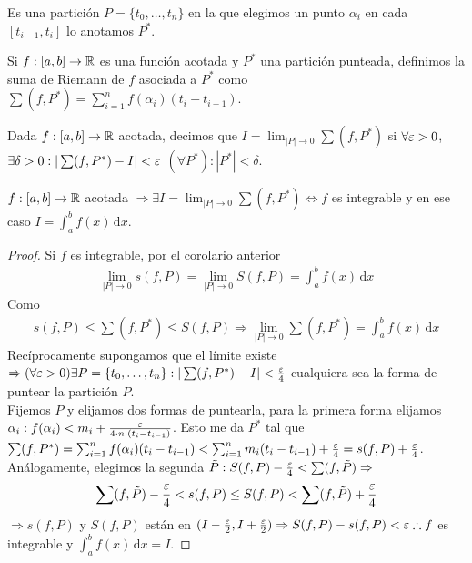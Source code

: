 \begin{definition}
  Es una partición \(P = \{t_0, \ldots, t_n\} \) en la que elegimos un punto \(\alpha_i\) en cada \([t_{i-1}, t_i]\) lo anotamos \(P^*\).
\end{definition}

\begin{definition}
  Si \(f: [a,b] \to \mathbb{R} \) es una función acotada y \(P^*\) una partición punteada, definimos la suma de Riemann de \(f\) asociada a \(P^*\) como \(\sum (f, P^*) = \sum_{i = 1}^n f(\alpha_i) (t_i - t_{i-1})\).
\end{definition}

\begin{definition}
  Dada \(f: [a, b] \to \mathbb{R} \) acotada, decimos que \(I = \lim_{|P| \to 0} \sum (f, P^*)\) si \(\forall \varepsilon > 0\), \(\exists \delta > 0 : | \sum (f, P^*) - I| < \varepsilon \) \((\forall P^*) : |P^*| < \delta \).
\end{definition}

\begin{theorem}
  \(f: [a, b] \to \mathbb{R} \) acotada \(\Rightarrow \exists I = \lim_{|P| \to 0} \sum (f, P^*) \iff f\) es integrable y en ese caso \(I = \int_a^b f(x) \, \mathrm{d}x\).
  \begin{proof}
    Si \(f\) es integrable, por el corolario anterior \begin{align*}
      \lim_{|P| \to 0} s(f, P) = \lim_{|P| \to 0} S(f, P) = \int_a^b f(x) \, \mathrm{d}x
    \end{align*}
    Como \begin{align*}s(f, P) \leq \sum(f, P^*) \leq S(f, P) \Rightarrow \lim_{|P| \to 0} \sum(f, P^*) = \int_a^b f(x) \, \mathrm{d}x \end{align*}
    Recíprocamente supongamos que el límite existe \(\Rightarrow (\forall \varepsilon > 0) \exists P = \{ t_0, \ldots, t_n \} : |\sum (f, P^*) - I| < \frac{\varepsilon}{4} \) cualquiera sea la forma de puntear la partición \(P\). \\
    Fijemos \(P\) y elijamos dos formas de puntearla, para la primera forma elijamos \(\alpha_i : f(\alpha_i) < m_i + \frac{\varepsilon}{4 \cdot n \cdot (t_i - t_{i-1})} \). Esto me da \(P^*\) tal que \(\sum (f, P^*) = \sum_{i = 1}^n f(\alpha_i) (t_i - t_{i-1}) < \sum_{i = 1}^n m_i (t_i - t_{i-1}) + \frac{\varepsilon}{4} = s(f, P) + \frac{\varepsilon}{4} \). \\
    Análogamente, elegimos la segunda \(\tilde{P} : S(f, P) - \frac{\varepsilon}{4} < \sum (f, \tilde{P}) \Rightarrow \)
    \begin{align*}
      \sum (f, \tilde{P}) - \frac{\varepsilon}{4} < s(f, P) \leq S(f, P) < \sum (f, \tilde{P}) + \frac{\varepsilon}{4}
    \end{align*}
    \(\Rightarrow s(f, P)\) y \(S(f, P)\) están en \((I - \frac{\varepsilon}{2}, I + \frac{\varepsilon}{2}) \Rightarrow S(f, P)- s(f, P) < \varepsilon \therefore f\) es integrable y \(\int_a^b f(x) \, \mathrm{d}x = I\).
  \end{proof}
\end{theorem}

